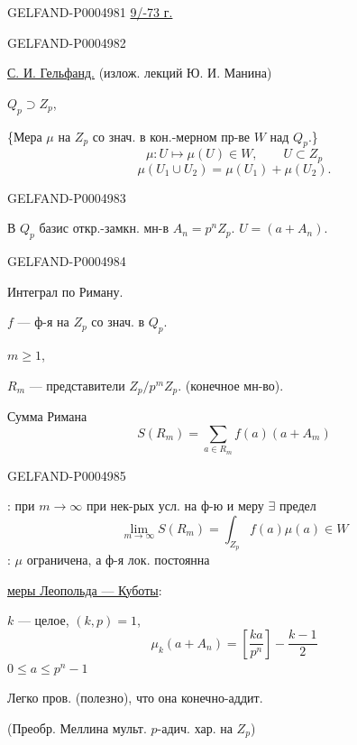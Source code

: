 \begin{GelfandAdjacentEvidence}{GELFAND-P000498}{1}
\uline{9/\mbox{}-73 г.}
\end{GelfandAdjacentEvidence}
\begin{GelfandAdjacentEvidence}{GELFAND-P000498}{2}


\uline{С. И. Гельфанд.} (излож. лекций Ю. И. Манина)

$Q_p\supset Z_p$,

\{Мера $\mu$ на $Z_p$ со знач. в кон.-мерном пр-ве $W$ над $Q_p$.\}
\[
\mu:U\longmapsto\mu(U)\in W,\qquad U\subset Z_p
\]
\[
\mu(U_1\cup U_2)=\mu(U_1)+\mu(U_2).
\]
\end{GelfandAdjacentEvidence}
\begin{GelfandAdjacentEvidence}{GELFAND-P000498}{3}


В $Q_p$ базис откр.-замкн. мн-в $A_n=p^nZ_p$. \quad $U=(a+A_n)$.
\end{GelfandAdjacentEvidence}
\begin{GelfandAdjacentEvidence}{GELFAND-P000498}{4}


Интеграл по Риману.

$f$ — ф-я на $Z_p$ со знач. в $Q_p$.

$m\ge1$,

$R_m$ — представители $Z_p/p^mZ_p$. (конечное мн-во).

Сумма Римана
\[
S(R_m)=\sum_{a\in R_m}f(a)(a+A_m)
\]
\end{GelfandAdjacentEvidence}
\begin{GelfandAdjacentEvidence}{GELFAND-P000498}{5}


: при $m\to\infty$ при нек-рых усл. на ф-ю и меру $\exists$ предел
\[
\lim_{m\to\infty}S(R_m)=\int_{Z_p}f(a)\mu(a)\in W
\]
: $\mu$ ограничена, а ф-я лок. постоянна

\uline{меры Леопольда — Куботы}:

$k$ — целое, $(k,p)=1$,
\[
\mu_k(a+A_n)=\left[\frac{ka}{p^n}\right]-\frac{k-1}{2}
\]
$0\le a\le p^n-1$

Легко пров. (полезно), что она конечно-аддит.

(Преобр. Меллина
мульт. $p$-адич. хар. на $Z_p$)
\end{GelfandAdjacentEvidence}
